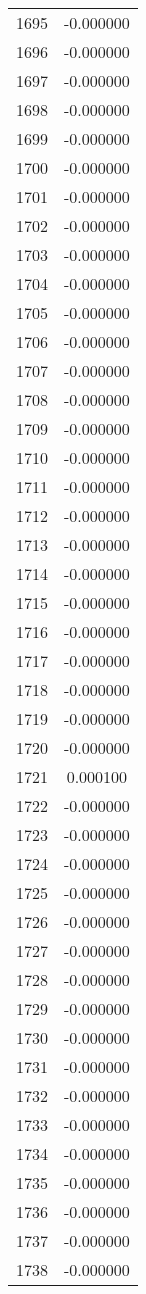 \documentclass[12pt]{article}
\begin{document}
\begin{longtable}{@{}cc@{}}
1695 & -0.000000 \\
1696 & -0.000000 \\
1697 & -0.000000 \\
1698 & -0.000000 \\
1699 & -0.000000 \\
1700 & -0.000000 \\
1701 & -0.000000 \\
1702 & -0.000000 \\
1703 & -0.000000 \\
1704 & -0.000000 \\
1705 & -0.000000 \\
1706 & -0.000000 \\
1707 & -0.000000 \\
1708 & -0.000000 \\
1709 & -0.000000 \\
1710 & -0.000000 \\
1711 & -0.000000 \\
1712 & -0.000000 \\
1713 & -0.000000 \\
1714 & -0.000000 \\
1715 & -0.000000 \\
1716 & -0.000000 \\
1717 & -0.000000 \\
1718 & -0.000000 \\
1719 & -0.000000 \\
1720 & -0.000000 \\
1721 & 0.000100 \\
1722 & -0.000000 \\
1723 & -0.000000 \\
1724 & -0.000000 \\
1725 & -0.000000 \\
1726 & -0.000000 \\
1727 & -0.000000 \\
1728 & -0.000000 \\
1729 & -0.000000 \\
1730 & -0.000000 \\
1731 & -0.000000 \\
1732 & -0.000000 \\
1733 & -0.000000 \\
1734 & -0.000000 \\
1735 & -0.000000 \\
1736 & -0.000000 \\
1737 & -0.000000 \\
1738 & -0.000000 \\

\end{longtable}
\end{document}
